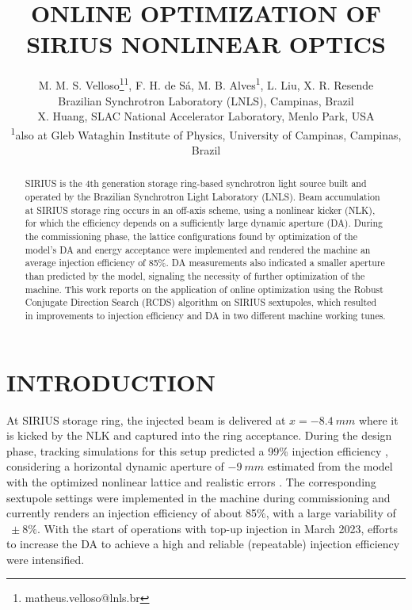 \documentclass[a4paper,
               keeplastbox,   %
               ]{jacow}
\begin{document}
\title{ONLINE OPTIMIZATION OF SIRIUS NONLINEAR OPTICS}

\author{M. M. S. Velloso\thanks{matheus.velloso@lnls.br}\textsuperscript{1}, F. H. de Sá, M. B. Alves\textsuperscript{1}, L. Liu, X. R. Resende\\ Brazilian Synchrotron Laboratory (LNLS), Campinas, Brazil \\
		X. Huang, SLAC National Accelerator Laboratory, Menlo Park, USA \\
		\textsuperscript{1}also at Gleb Wataghin Institute of Physics, University of Campinas, Campinas, Brazil 
}
	
\maketitle
%
\begin{abstract}
SIRIUS is the 4th generation storage ring-based synchrotron light source built and operated by the Brazilian Synchrotron Light Laboratory (LNLS). Beam accumulation at SIRIUS storage ring occurs in an off-axis scheme, using a nonlinear kicker (NLK), for which the efficiency depends on a sufficiently large dynamic aperture (DA). During the commissioning phase, the lattice configurations found by optimization of the model's DA and energy acceptance were implemented and rendered the machine an average injection efficiency of 85\%. DA measurements also indicated a smaller aperture than predicted by the model, signaling the necessity of further optimization of the machine. 
This work reports on the application of online optimization using the Robust Conjugate Direction Search (RCDS) algorithm on SIRIUS sextupoles, which resulted in improvements to injection efficiency and DA in two different machine working tunes. 
\end{abstract}

\section{INTRODUCTION}
At SIRIUS storage ring, the injected beam is delivered at $x=-8.4~\unit{mm}$ where it is kicked by the NLK and captured into the ring acceptance. During the design phase, tracking simulations for this setup predicted a 99\% injection efficiency \cite{Liu:IPAC2016-THPMR011}, considering a horizontal dynamic aperture of $-9~\unit{mm}$  estimated from the model with the optimized nonlinear lattice and realistic errors \cite{deSá:IPAC2016-THPMR012}.  The corresponding sextupole settings were implemented in the machine during commissioning and currently renders an injection efficiency of about 85\%, with a large variability of $~\pm8\%$. With the start of operations with top-up injection in March 2023, efforts to increase the DA to achieve a high and reliable (repeatable) injection efficiency were intensified. 
\end{document}
